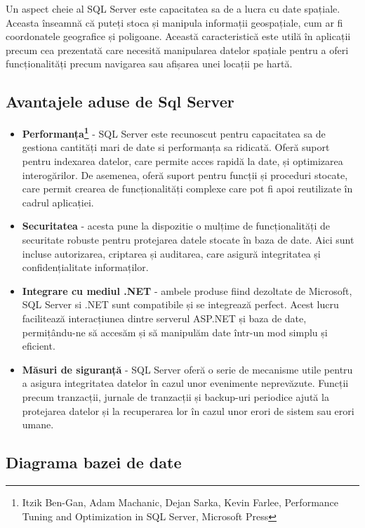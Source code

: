Un aspect cheie al SQL Server este capacitatea sa de a lucra cu date spațiale. Aceasta înseamnă că puteți stoca și manipula informații geospațiale, cum ar fi coordonatele geografice și poligoane. Această caracteristică este utilă în aplicații precum cea prezentată care necesită manipularea datelor spațiale pentru a oferi funcționalități precum navigarea sau afișarea unei locații pe hartă.

\subsection{Avantajele aduse de Sql Server}

\begin{itemize}
    \item \textbf{Performanța\footnote{Itzik Ben-Gan, Adam Machanic, Dejan Sarka, Kevin Farlee, Performance Tuning
    and Optimization in SQL Server, Microsoft Press}} - SQL Server este recunoscut pentru capacitatea sa de gestiona cantități mari de date si performanța sa ridicată. Oferă suport pentru indexarea datelor, care permite acces rapidă la date, și optimizarea interogărilor. De asemenea, oferă suport pentru funcții și proceduri stocate, care permit crearea de funcționalități complexe care pot fi apoi reutilizate în cadrul aplicației.
    \item \textbf{Securitatea} - acesta pune la dispozitie o mulțime de funcționalități de securitate robuste pentru protejarea datele stocate în baza de date. Aici sunt incluse autorizarea, criptarea și auditarea, care asigură integritatea și confidențialitate informaților.

    \item \textbf{Integrare cu mediul .NET} - ambele produse fiind dezoltate de Microsoft, SQL Server si .NET sunt compatibile și se integrează perfect. Acest lucru facilitează interacțiunea dintre serverul ASP.NET și baza de date, permițându-ne să accesăm și să manipulăm date într-un mod simplu și eficient.
    \item \textbf{Măsuri de siguranță} - SQL Server oferă o serie de mecanisme utile pentru a asigura integritatea datelor în cazul unor evenimente neprevăzute. Funcții precum tranzacții, jurnale de tranzacții și backup-uri periodice ajută la protejarea datelor și la recuperarea lor în cazul unor erori de sistem sau erori umane.
\end{itemize}

\newpage

\subsection{Diagrama bazei de date}


